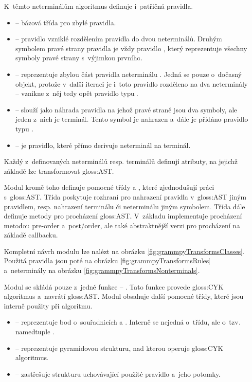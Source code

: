 \begin{itemize}
			K~těmto neterminálům algoritmus definuje i~patřičná pravidla.
			\begin{itemize}
				\item {} -- bázová třída pro zbylé pravidla.
				\item {} -- pravidlo vzniklé rozdělením pravidla do dvou neterminálů. Druhým symbolem pravé strany pravidla je vždy pravidlo , který reprezentuje všechny symboly pravé strany s~výjimkou prvního.
				\item {} -- reprezentuje zbylou část pravidla neterminálu . Jedná se pouze o~dočasný objekt, protože v~další iteraci je i~toto pravidlo rozděleno na dva neterminály -- vznikne z~něj tedy opět pravidlo typu .
				\item {} -- slouží jako náhrada pravidla na jehož pravé straně jsou dva symboly, ale jeden z~nich je terminál. Tento symbol je nahrazen  a~dále je přidáno pravidlo typu .
				\item {} -- je pravidlo, které přímo derivuje neterminál na terminál.
			\end{itemize}
		
			Každý z~definovaných neterminálů resp. terminálů definují atributy, na jejichž základě lze transformovat \gls{gloss:AST}.
		\end{itemize}
	
		Modul kromě toho definuje pomocné třídy  a , které zjednodušují práci s~\gls{gloss:AST}. Třída  poskytuje rozhraní pro nahrazení pravidla v~\gls{gloss:AST} jiným pravidlem, resp. nahrazení terminálu či neterminálu jiným symbolem. Třída  dále definuje metody pro procházení \gls{gloss:AST}. V~základu implementuje procházení metodou pre-order a~post\=/or\-der, ale také abstraktnější verzi pro procházení na základě callbacku.
		
		Kompletní návrh modulu lze nalézt na obrázku \ref{fig:grammpyTransformsClasses}. Použitá pravidla jsou poté na obrázku \ref{fig:grammpyTransformsRules} a~neterminály na obrázku \ref{fig:grammpyTransformsNonterminals}.
		
		\vspace{1em}
		
		Modul  se skládá pouze z~jedné funkce -- . Tato funkce provede \gls{gloss:CYK} algoritmus a~navrátí \gls{gloss:AST}. Modul obsahuje další pomocné třídy, které jsou interně použity při algoritmu.
		\begin{itemize}
			\item {} -- reprezentuje bod o~souřadnicích  a . Interně se nejedná o~třídu, ale o~tzv. namedtuple \cite{namedtuple}.
			\item {} -- reprezentuje pyramidovou strukturu, nad kterou operuje \gls{gloss:CYK} algoritmus.
			\item {} -- zastřešuje strukturu uchovávající použité pravidlo a~jeho potomky.
		\end{itemize}
	
